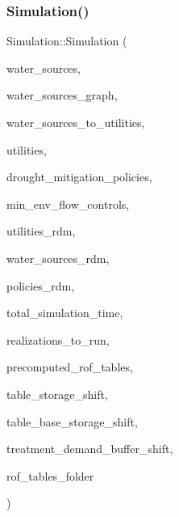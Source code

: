 \subsubsection{\texorpdfstring{Simulation()}{Simulation()}\hspace{0.1cm}{\footnotesize\ttfamily [3/4]}}
{\footnotesize\ttfamily Simulation\+::\+Simulation (\begin{DoxyParamCaption}\item[{vector$<$ \mbox{\hyperlink{classWaterSource}{Water\+Source}} $\ast$$>$ \&}]{water\+\_\+sources,  }\item[{\mbox{\hyperlink{classGraph}{Graph}} \&}]{water\+\_\+sources\+\_\+graph,  }\item[{const vector$<$ vector$<$ int $>$$>$ \&}]{water\+\_\+sources\+\_\+to\+\_\+utilities,  }\item[{vector$<$ \mbox{\hyperlink{classUtility}{Utility}} $\ast$$>$ \&}]{utilities,  }\item[{const vector$<$ \mbox{\hyperlink{classDroughtMitigationPolicy}{Drought\+Mitigation\+Policy}} $\ast$$>$ \&}]{drought\+\_\+mitigation\+\_\+policies,  }\item[{vector$<$ \mbox{\hyperlink{classMinEnvFlowControl}{Min\+Env\+Flow\+Control}} $\ast$$>$ \&}]{min\+\_\+env\+\_\+flow\+\_\+controls,  }\item[{vector$<$ vector$<$ double $>$$>$ \&}]{utilities\+\_\+rdm,  }\item[{vector$<$ vector$<$ double $>$$>$ \&}]{water\+\_\+sources\+\_\+rdm,  }\item[{vector$<$ vector$<$ double $>$$>$ \&}]{policies\+\_\+rdm,  }\item[{const unsigned long}]{total\+\_\+simulation\+\_\+time,  }\item[{vector$<$ unsigned long $>$ \&}]{realizations\+\_\+to\+\_\+run,  }\item[{vector$<$ vector$<$ \mbox{\hyperlink{classMatrix2D}{Matrix2D}}$<$ double $>$$>$$>$ \&}]{precomputed\+\_\+rof\+\_\+tables,  }\item[{vector$<$ vector$<$ double $>$$>$ \&}]{table\+\_\+storage\+\_\+shift,  }\item[{vector$<$ vector$<$ double $>$$>$ \&}]{table\+\_\+base\+\_\+storage\+\_\+shift,  }\item[{vector$<$ vector$<$ double $>$$>$ \&}]{treatment\+\_\+demand\+\_\+buffer\+\_\+shift,  }\item[{string \&}]{rof\+\_\+tables\+\_\+folder }\end{DoxyParamCaption})}



